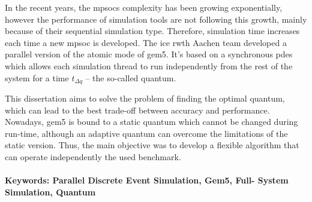 





In the recent years, the \glspl{mpsoc} complexity has been growing exponentially, however the performance of simulation tools are not following this growth, mainly because of their sequential simulation type. Therefore, simulation time increases each time a new \gls{mpsoc} is developed. The \gls{ice} \gls{rwth} Aachen team developed a parallel version of the atomic mode of gem5. It’s based on a synchronous \gls{pdes} which allows each simulation thread to run independently from the rest of the system for a time $t_{\Delta q}$ – the so-called quantum.

This dissertation aims to solve the problem of finding the optimal quantum, which can lead to the best trade-off between accuracy and performance. Nowadays, gem5 is bound to a static quantum which cannot be changed during run-time, although an adaptive quantum can overcome the limitations of the static version. Thus, the main objective was to develop a flexible algorithm that can operate independently the used benchmark.  


\paragraph{}\textbf{Keywords: Parallel Discrete Event Simulation, Gem5, Full-
System Simulation, Quantum}
\begin{comment}
\glsreset{FPGA}
\end{comment}

